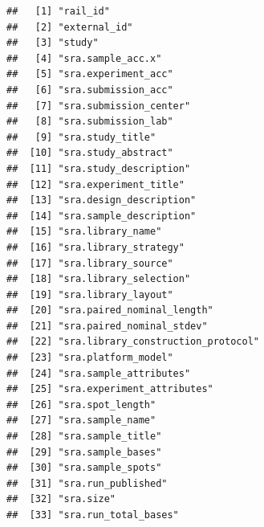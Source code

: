 \documentclass[
]{article}
\begin{document}
\begin{verbatim}
##   [1] "rail_id"                                                           
##   [2] "external_id"                                                       
##   [3] "study"                                                             
##   [4] "sra.sample_acc.x"                                                  
##   [5] "sra.experiment_acc"                                                
##   [6] "sra.submission_acc"                                                
##   [7] "sra.submission_center"                                             
##   [8] "sra.submission_lab"                                                
##   [9] "sra.study_title"                                                   
##  [10] "sra.study_abstract"                                                
##  [11] "sra.study_description"                                             
##  [12] "sra.experiment_title"                                              
##  [13] "sra.design_description"                                            
##  [14] "sra.sample_description"                                            
##  [15] "sra.library_name"                                                  
##  [16] "sra.library_strategy"                                              
##  [17] "sra.library_source"                                                
##  [18] "sra.library_selection"                                             
##  [19] "sra.library_layout"                                                
##  [20] "sra.paired_nominal_length"                                         
##  [21] "sra.paired_nominal_stdev"                                          
##  [22] "sra.library_construction_protocol"                                 
##  [23] "sra.platform_model"                                                
##  [24] "sra.sample_attributes"                                             
##  [25] "sra.experiment_attributes"                                         
##  [26] "sra.spot_length"                                                   
##  [27] "sra.sample_name"                                                   
##  [28] "sra.sample_title"                                                  
##  [29] "sra.sample_bases"                                                  
##  [30] "sra.sample_spots"                                                  
##  [31] "sra.run_published"                                                 
##  [32] "sra.size"                                                          
##  [33] "sra.run_total_bases"                                               

\end{verbatim}
\end{document}
